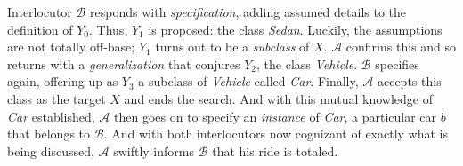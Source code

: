 Interlocutor $\mathcal{B}$ responds with \textit{specification}, adding assumed details to the definition of $Y_0$. Thus, $Y_1$ is proposed: the class \textit{Sedan}. Luckily, the assumptions are not totally off-base; $Y_1$ turns out to be a \textit{subclass} of $X$. $\mathcal{A}$ confirms this and so returns with a \textit{generalization} that conjures $Y_2$, the class \textit{Vehicle}. $\mathcal{B}$ specifies again, offering up as $Y_3$ a subclass of \textit{Vehicle} called \textit{Car}. Finally, $\mathcal{A}$ accepts this class as the target $X$ and ends the search. And with this mutual knowledge of \textit{Car} established, $\mathcal{A}$ then goes on to specify an \textit{instance} of \textit{Car}, a particular car $b$ that belongs to $\mathcal{B}$. And with both interlocutors now cognizant of exactly what is being discussed, $\mathcal{A}$ swiftly informs $\mathcal{B}$ that his ride is totaled.

